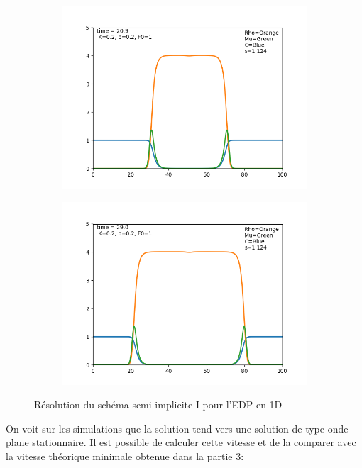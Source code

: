 \documentclass[11pt]{article}
\begin{document}
\begin{figure}[hbt!]
\begin{subfigure}[b]{0.45\textwidth}
\end{subfigure}
\begin{subfigure}[b]{0.45\textwidth}
\includegraphics[width=\textwidth]{Images/edp_1d_2.png}
\end{subfigure}
\begin{subfigure}[b]{0.45\textwidth}
\includegraphics[width=\textwidth]{Images/edp_1d_3.png}
\end{subfigure}
\caption{Résolution du schéma semi implicite I pour l'EDP en 1D} 
\end{figure}
On voit sur les simulations que la solution tend vers une solution de type onde plane stationnaire. Il est possible de calculer cette vitesse et de la comparer avec la vitesse théorique minimale obtenue dans la partie 3: 
\end{document}
